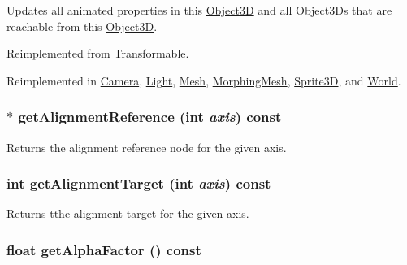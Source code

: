 Updates all animated properties in this \hyperlink{classm3g_1_1Object3D}{Object3D} and all Object3Ds that are reachable from this \hyperlink{classm3g_1_1Object3D}{Object3D}. 

Reimplemented from \hyperlink{classm3g_1_1Transformable_8aad1ceab4c2a03609c8a42324ce484d}{Transformable}.

Reimplemented in \hyperlink{classm3g_1_1Camera_8aad1ceab4c2a03609c8a42324ce484d}{Camera}, \hyperlink{classm3g_1_1Light_8aad1ceab4c2a03609c8a42324ce484d}{Light}, \hyperlink{classm3g_1_1Mesh_82cfeb67ca66b93e2ca7bda9a4f0e2aa}{Mesh}, \hyperlink{classm3g_1_1MorphingMesh_8aad1ceab4c2a03609c8a42324ce484d}{MorphingMesh}, \hyperlink{classm3g_1_1Sprite3D_8aad1ceab4c2a03609c8a42324ce484d}{Sprite3D}, and \hyperlink{classm3g_1_1World_8aad1ceab4c2a03609c8a42324ce484d}{World}.\hypertarget{classm3g_1_1Node_ca338390bd2dee287fe6f5cbc4e094e1}{
\subsubsection[{getAlignmentReference}]{ $\ast$ getAlignmentReference (int {\em axis}) const}}
\label{classm3g_1_1Node_ca338390bd2dee287fe6f5cbc4e094e1}


Returns the alignment reference node for the given axis. \hypertarget{classm3g_1_1Node_e5bbf42b3d88193fda0b476e1b1da009}{
\subsubsection[{getAlignmentTarget}]{\setlength{\rightskip}{0pt plus 5cm}int getAlignmentTarget (int {\em axis}) const}}
\label{classm3g_1_1Node_e5bbf42b3d88193fda0b476e1b1da009}


Returns tthe alignment target for the given axis. \hypertarget{classm3g_1_1Node_bf7e8f9d9f530274aaf27e69910f8689}{
\subsubsection[{getAlphaFactor}]{\setlength{\rightskip}{0pt plus 5cm}float getAlphaFactor () const}}
\label{classm3g_1_1Node_bf7e8f9d9f530274aaf27e69910f8689}


